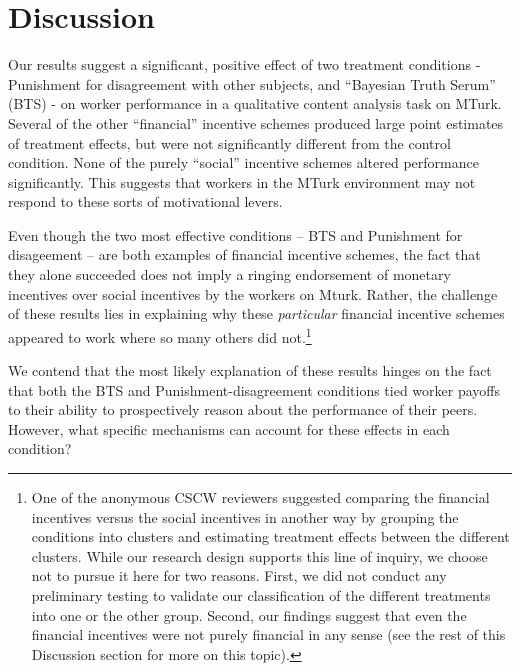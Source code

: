 \documentclass{cscw2010}
\begin{document}
\section{Discussion} 

Our results suggest a significant, positive effect of two treatment
conditions - Punishment for disagreement with other subjects, and
``Bayesian Truth Serum'' (BTS) - on worker performance in a qualitative
content analysis task on MTurk. Several of the other ``financial''
incentive schemes produced large point estimates of treatment effects,
but were not significantly different from the control condition. None
of the purely ``social'' incentive schemes altered performance
significantly. This suggests that workers in the MTurk environment may
not respond to these sorts of motivational levers.

Even though the two most effective conditions -- BTS
and Punishment for disageement -- are both examples of financial incentive
schemes, the fact that they alone succeeded does not imply a ringing
endorsement of monetary incentives over social incentives by the
workers on Mturk. Rather, the challenge of these results lies in
explaining why these \emph{particular} financial incentive schemes
appeared to work where so many others did not.\footnote{One of the
  anonymous CSCW reviewers suggested comparing the financial
  incentives versus the social incentives in another way by grouping
  the conditions into clusters and estimating treatment effects
  between the different clusters. While our research design supports
  this line of inquiry, we choose not to pursue it here for two
  reasons. First, we did not conduct any preliminary testing to
  validate our classification of the different treatments into one or
  the other group. Second, our findings suggest that even the
  financial incentives were not purely financial in any sense (see the
  rest of this Discussion section for more on this topic).}

We contend that the most likely explanation of these results hinges on
the fact that both the BTS and Punishment-disagreement conditions tied
worker payoffs to their ability to prospectively reason about the
performance of their peers. However, what specific mechanisms can
account for these effects in each condition?
\end{document}

